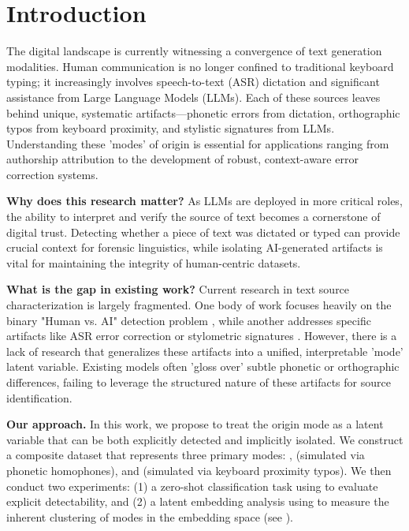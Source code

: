 \section{Introduction}
\label{sec:intro}

The digital landscape is currently witnessing a convergence of text generation modalities.
Human communication is no longer confined to traditional keyboard typing; it increasingly involves speech-to-text (ASR) dictation and significant assistance from Large Language Models (LLMs).
Each of these sources leaves behind unique, systematic artifacts—phonetic errors from dictation, orthographic typos from keyboard proximity, and stylistic signatures from LLMs.
Understanding these 'modes' of origin is essential for applications ranging from authorship attribution to the development of robust, context-aware error correction systems.

{\bf Why does this research matter?}
As LLMs are deployed in more critical roles, the ability to interpret and verify the source of text becomes a cornerstone of digital trust.
Detecting whether a piece of text was dictated or typed can provide crucial context for forensic linguistics, while isolating AI-generated artifacts is vital for maintaining the integrity of human-centric datasets.

{\bf What is the gap in existing work?}
Current research in text source characterization is largely fragmented.
One body of work focuses heavily on the binary "Human vs. AI" detection problem \cite{ta2025faid}, while another addresses specific artifacts like ASR error correction \cite{havare2026lost} or stylometric signatures \cite{kumarage2023neural}.
However, there is a lack of research that generalizes these artifacts into a unified, interpretable 'mode' latent variable.
Existing models often 'gloss over' subtle phonetic or orthographic differences, failing to leverage the structured nature of these artifacts for source identification.

{\bf Our approach.}
In this work, we propose to treat the origin mode as a latent variable that can be both explicitly detected and implicitly isolated.
We construct a composite dataset that represents three primary modes: \aigen, \dictated (simulated via phonetic homophones), and \typed (simulated via keyboard proximity typos).
We then conduct two experiments: (1) a zero-shot classification task using \gptmini to evaluate explicit detectability, and (2) a latent embedding analysis using \minilm to measure the inherent clustering of modes in the embedding space (see ).


